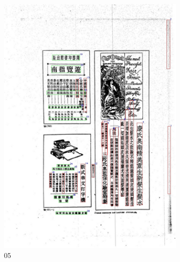 \documentclass[12pt,twoside]{report}
\begin{document}
\begin{figure}[htbp]
    \centering
    \begin{subfigure}[b]{0.3\linewidth}
        \includegraphics[height=1.35\linewidth]{./figures/samples/05.jpg}
        \caption{05}
        \label{fig:ours_05}
    \end{subfigure}
    \hfill
    \begin{subfigure}[b]{0.3\linewidth}

\end{subfigure}
\end{figure}
\end{document}
